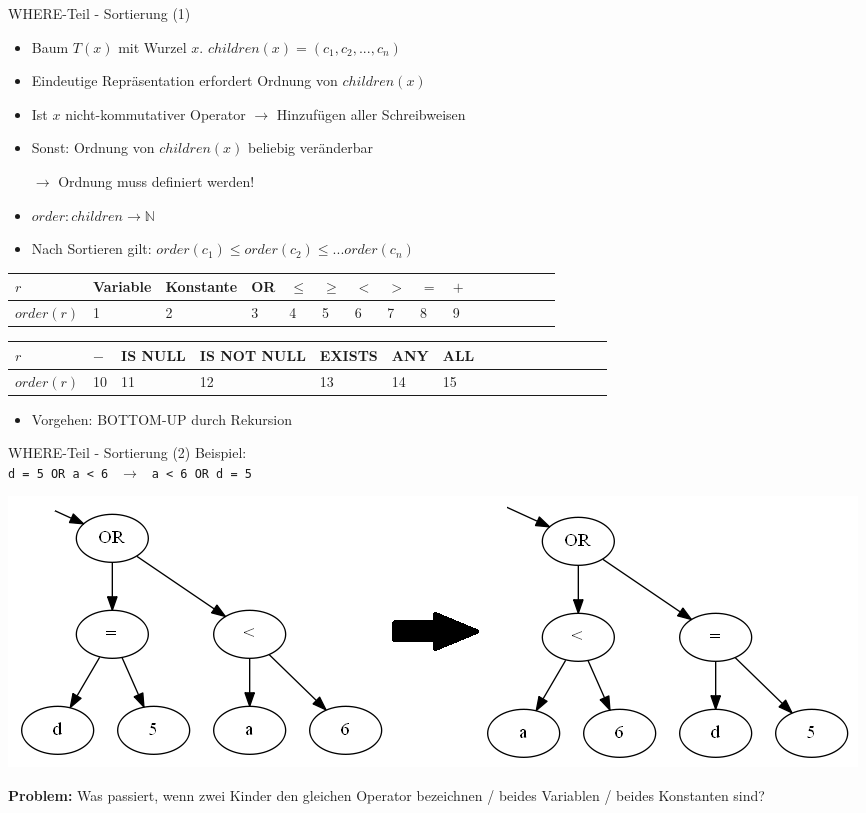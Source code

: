 \documentclass{beamer}
\begin{document}
\begin{frame}[fragile]{WHERE-Teil - Sortierung (1)}
\begin{itemize}
\item Baum $T(x)$ mit Wurzel $x$. $children(x) = (c_1,c_2,...,c_n)$
\item Eindeutige Repräsentation erfordert Ordnung von $children(x)$
\item Ist $x$ nicht-kommutativer Operator $\to$ Hinzufügen aller Schreibweisen
\item Sonst: Ordnung von $children(x)$ beliebig veränderbar
\item[$\to$] Ordnung muss definiert werden! 
\item $order: children \to \mathbb{N}$
\item Nach Sortieren gilt: $order(c_1) \leq order(c_2) \leq ... order(c_n)$
\end{itemize}
\begin{tabular}{|l|l|l|l|l|l|l|l|l|l|l|l|l|l|l|l|}
\hline
$r$ & Variable & Konstante & OR & $\le$ & $\ge$ & $<$ & $>$ & $=$ & $+$\\\hline
$\textit{order}(r)$ & 1 & 2 & 3 & 4 & 5 & 6 & 7 & 8 & 9\\ 
\hline
\end{tabular}\newline
\begin{tabular}{|l|l|l|l|l|l|l|l|l|l|l|l|l|l|l|l|}
\hline
$r$  & $-$  & IS NULL & IS NOT NULL & EXISTS & ANY & ALL  \\\hline
$\textit{order}(r)$ &   10 & 11& 12 & 13 & 14 & 15 \\ 
\hline
\end{tabular}
\begin{itemize}
\item Vorgehen: BOTTOM-UP durch Rekursion
\end{itemize}
\end{frame}

\begin{frame}[fragile]{WHERE-Teil - Sortierung (2)}
Beispiel:\\
\verb|d = 5 OR a < 6| $\ \ \to\ \ $ \verb|a < 6 OR d = 5|\\
\begin{center}
\includegraphics[scale=0.3]{sort_step1.png}
\end{center}
\textbf{Problem: }Was passiert, wenn zwei Kinder den gleichen Operator bezeichnen / beides Variablen / beides Konstanten sind?
\end{frame}
\end{document}
